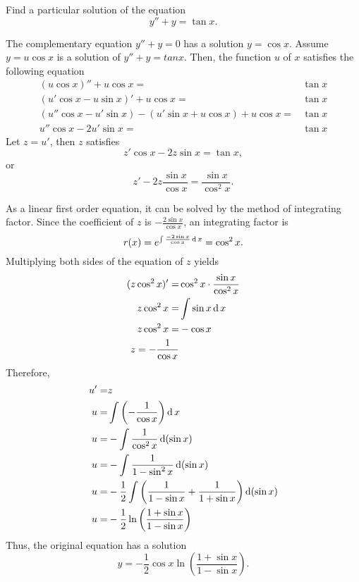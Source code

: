 \begin{example}
  Find a particular solution of the equation
  \[y'' + y = \tan x.\]
\end{example}
\begin{solution}
  The complementary equation $y''+y=0$ has a solution $y=\cos x$.
  Assume $y=u\cos x$ is a solution of $y'' + y = tan x$.
  Then, the function $u$ of $x$ satisfies the following equation
  \[
  \begin{aligned}
    (u\cos x)''+ u\cos x=&\tan x\\
    (u'\cos x-u\sin x)' + u\cos x=&\tan x\\
    (u''\cos x-u'\sin x) - (u'\sin x+u\cos x)+u\cos x=&\tan x\\
    u''\cos x - 2u'\sin x =&\tan x
  \end{aligned}  
  \]
  Let $z=u'$, then $z$ satisfies
  \[z'\cos x - 2z\sin x=\tan x,\]
or
\[z' - 2z\frac{\sin x}{\cos x}=\frac{\sin x}{\cos^2 x}.\]

As a linear first order equation, it can be solved by the method of integrating factor.
Since the coefficient of $z$ is $-\frac{2\sin x}{\cos x}$, an integrating factor is
\[r(x)=e^{\int \frac{-2\sin x}{\cos x}\operatorname{d} x}=\cos^2 x.\]
Multiplying both sides of the equation of $z$ yields
\[
\begin{aligned}
  (z\cos^2 x)'=&\cos^2x\cdot\frac{\sin x}{\cos^2 x}\\
  z\cos^2 x=&\int \sin x \operatorname{d} x\\
  z\cos^2 x=&-\cos x\\
  z=-\frac{1}{\cos x}&
\end{aligned}  
\]
Therefore,
\[
\begin{aligned}
  u'=&z\\
  u=&\int\left(-\frac{1}{\cos x}\right)\operatorname{d} x\\
  u=&-\int \frac{1}{\cos^2 x}\operatorname{d}(\sin x)\\
  u=&-\int \frac{1}{1-\sin^2 x}\operatorname{d}(\sin x)\\
  u=&-\frac12\int\left(\frac{1}{1-\sin x}+\frac{1}{1+\sin x}\right)\operatorname{d}(\sin x)\\
  u=&-\frac12\ln\left(\frac{1+\sin x}{1-\sin x}\right)\\
\end{aligned}  
\]
Thus, the original equation has a solution
\[y=-\frac12\cos x\ln\left(\frac{1+\sin x}{1-\sin x}\right).\]
\end{solution}

